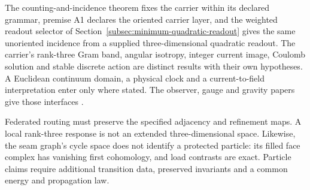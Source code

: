 \documentclass[11pt]{article}
\theoremstyle{remark}
\theoremstyle{plain}
\begin{document}
The counting-and-incidence theorem fixes the carrier within its declared
grammar, premise A1 declares the oriented carrier layer, and the weighted
readout selector of Section~\ref{subsec:minimum-quadratic-readout} gives the
same unoriented incidence from a supplied three-dimensional quadratic readout.
The carrier's rank-three Gram band, angular isotropy, integer current image,
Coulomb solution and stable discrete action are distinct results with their
own hypotheses. A Euclidean continuum domain, a physical clock and a
current-to-field interpretation enter only where stated. The observer,
gauge and gravity papers give those interfaces \cite{ophobservers,ophGauge,ophEinstein}.

Federated routing must preserve the specified adjacency and refinement
maps. A local rank-three response is not an extended three-dimensional
space. Likewise, the seam graph's cycle space does not identify a protected
particle: its filled face complex has vanishing first cohomology, and load
contrasts are exact. Particle claims require additional transition data,
preserved invariants and a common energy and propagation law.
\end{document}
